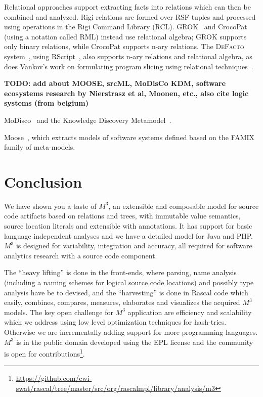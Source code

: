 \documentclass[conference]{IEEEtran}
\newcommand{\Rascal}{\textsc{Rascal}}
\newcommand{\DeFacto}{\textsc{DeFacto}\xspace}
\newcommand{\mthree}{\ensuremath{M^3}\xspace}
\begin{document}
Relational approaches support extracting facts into relations which can then
be combined and analyzed. Rigi relations are formed over RSF tuples and
processed using operations in the Rigi Command Library (RCL).
GROK~\cite{Holt96} and CrocoPat~\cite{BeyerEtAl03,beyer05efficient} (using a
notation called RML) instead use relational algebra; GROK supports only binary
relations, while CrocoPat supports n-ary relations. The \DeFacto
system~\cite{DBLP:conf/sle/BastenK08}, using RScript~\cite{KlintRscript}, also
supports n-ary relations and relational algebra, as does Vankov's work on
formulating program slicing using relational techniques~\cite{Vankov05}.

\textbf{TODO: add about MOOSE, srcML, MoDisCo KDM, software ecosystems research by Nierstrasz et al, Moonen, etc., also cite logic systems (from belgium)}

MoDisco~\cite{DBLP:journals/infsof/BruneliereCDM14,DBLP:conf/kbse/BruneliereCJM10} 
and the Knowledge Discovery Metamodel~\cite{omg-kdm}.

Moose~\cite{DBLP:conf/sigsoft/NierstraszDG05,DBLP:journals/sigsoft/Nierstrasz12}, which extracts models of software systems defined based on the FAMIX family of meta-models.

\section{Conclusion}

We have shown you a taste of \mthree, an extensible and composable model for
source code artifacts based on relations and trees, with immutable value
semantics, source location literals and extensible with annotations. It has
support for basic language independent analyses and we have a detailed model
for Java and PHP. \mthree is designed for variability, integration and accuracy, all required for software analytics research with a source code component.

The ``heavy lifting'' is done in the front-ends, where parsing, name analysis (including a naming schemes for logical source code locations) and possibly type analysis have be to devised, and the ``harvesting'' is done in Rascal code which easily, combines, compares, measures, elaborates and visualizes the acquired \mthree models. The key open challenge for \mthree application are efficiency and scalability which we address using low level optimization techniques for hash-tries. Otherwise we are incrementally adding support for more programming languages. \mthree is in the public domain developed using the EPL license and the community is open for contributions\footnote{\url{https://github.com/cwi-swat/rascal/tree/master/src/org/rascalmpl/library/analysis/m3}}.



\end{document}
